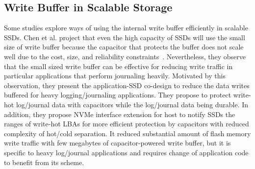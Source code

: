 \subsection{Write Buffer in Scalable Storage}
Some studies explore ways of using the internal write buffer efficiently in
scalable SSDs. Chen et al. project that even the high capacity of SSDs will use
the small size of write buffer because the capacitor that protects the buffer
does not scale well due to the cost, size, and reliability
constraints~\cite{ChenLZ19tc}. Nevertheless, they observe that the small sized
write buffer can be effective for reducing write traffic in particular
applications that perform journaling heavily. Motivated by this observation,
they present the application-SSD co-design to reduce the data writes buffered
for heavy logging/journaling applications. They propose to protect write-hot
log/journal data with capacitors while the log/journal data being durable.  In
addition, they propose NVMe interface extension for host to notify SSDs the
ranges of write-hot LBAs for more efficient protection by capacitors with
reduced complexity of hot/cold separation.  It reduced substantial amount of
flash memory write traffic with few megabytes of capacitor-powered write
buffer, but it is specific to heavy log/journal applications and requires
change of application code to benefit from its scheme.

